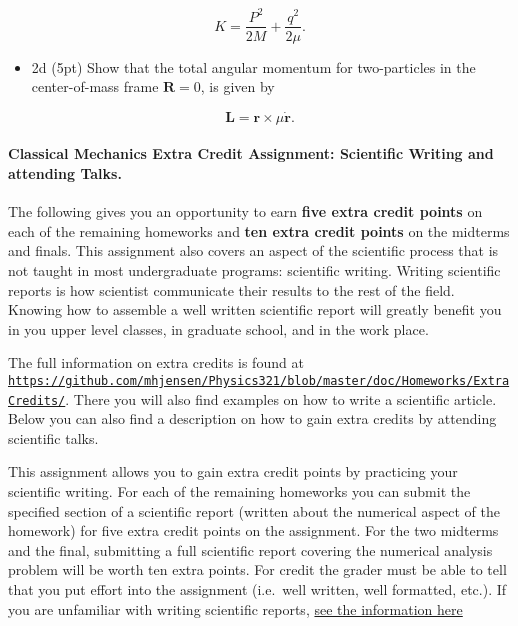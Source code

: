 \documentclass[%
oneside,                 %
final,                   %
10pt]{article}
\begin{document}
\noindent
\[
K=\frac{P^2}{2M}+\frac{q^2}{2\mu}.
\]

\begin{itemize}
\item 2d (5pt) Show that the total angular momentum for two-particles in the center-of-mass frame $\bm{R}=0$, is given by
\end{itemize}

\noindent
\[
\bm{L}=\bm{r}\times \mu\dot{\bm{r}}.
\]

\paragraph{Classical Mechanics Extra Credit Assignment: Scientific Writing and attending Talks.}
The following gives you an opportunity to earn \textbf{five extra credit
points} on each of the remaining homeworks and \textbf{ten extra credit points}
on the midterms and finals.  This assignment also covers an aspect of
the scientific process that is not taught in most undergraduate
programs: scientific writing.  Writing scientific reports is how
scientist communicate their results to the rest of the field.  Knowing
how to assemble a well written scientific report will greatly benefit
you in you upper level classes, in graduate school, and in the work
place.

The full information on extra credits is found at \href{{https://github.com/mhjensen/Physics321/blob/master/doc/Homeworks/ExtraCredits/}}{\nolinkurl{https://github.com/mhjensen/Physics321/blob/master/doc/Homeworks/ExtraCredits/}}. There you will also find examples on how to write a scientific article. 
Below you can also find a description on how to gain extra credits by attending scientific talks.

This assignment allows you to gain extra credit points by practicing
your scientific writing.  For each of the remaining homeworks you can
submit the specified section of a scientific report (written about the
numerical aspect of the homework) for five extra credit points on the
assignment.  For the two midterms and the final, submitting a full
scientific report covering the numerical analysis problem will be
worth ten extra points.  For credit the grader must be able to tell
that you put effort into the assignment (i.e.~well written, well
formatted, etc.).  If you are unfamiliar with writing scientific
reports, \href{{https://github.com/mhjensen/Physics321/blob/master/doc/Homeworks/ExtraCredits/IntroductionScientificWriting.md}}{see the information here}
\end{document}
